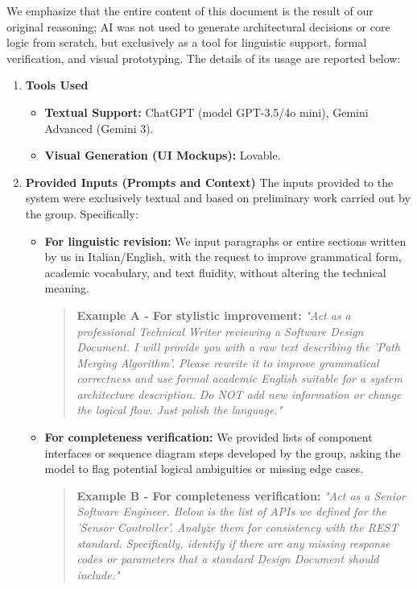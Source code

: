 We emphasize that the entire content of this document is the result of our original reasoning; AI was not used to generate architectural decisions or core logic from scratch, but exclusively as a tool for linguistic support, formal verification, and visual prototyping. The details of its usage are reported below:

\begin{enumerate}
    \item \textbf{Tools Used}
    \begin{itemize}
        \item \textbf{Textual Support:} ChatGPT (model GPT-3.5/4o mini), Gemini Advanced (Gemini 3).
        \item \textbf{Visual Generation (UI Mockups):} Lovable.
    \end{itemize}

    \item \textbf{Provided Inputs (Prompts and Context)} The inputs provided to the system were exclusively textual and based on preliminary work carried out by the group. Specifically:
    \begin{itemize}
        \item \textbf{For linguistic revision:} We input paragraphs or entire sections written by us in Italian/English, with the request to improve grammatical form, academic vocabulary, and text fluidity, without altering the technical meaning.
        \begin{quote}
            \textbf{Example A - For stylistic improvement:} \textit{"Act as a professional Technical Writer reviewing a Software Design Document. I will provide you with a raw text describing the 'Path Merging Algorithm'. Please rewrite it to improve grammatical correctness and use formal academic English suitable for a system architecture description. Do NOT add new information or change the logical flow. Just polish the language."}
        \end{quote}
        
        \item \textbf{For completeness verification:} We provided lists of component interfaces or sequence diagram steps developed by the group, asking the model to flag potential logical ambiguities or missing edge cases.
        \begin{quote}
            \textbf{Example B - For completeness verification:} \textit{"Act as a Senior Software Engineer. Below is the list of APIs we defined for the 'Sensor Controller'. Analyze them for consistency with the REST standard. Specifically, identify if there are any missing response codes or parameters that a standard Design Document should include."}
        \end{quote}
        

\end{itemize}
\end{enumerate}
